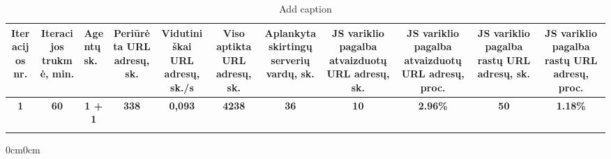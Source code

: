 \begin{table}[htbp]
\hspace{-5cm}
  \centering
  \caption{Add caption}
  \begin{adjustwidth}{-3cm}{0cm}
    \begin{tabular}{|c|c|c|c|c|c|c|c|c|c|c|}
    \hline
    \multicolumn{1}{|p{4.285em}|}{Iteracijos nr.} & \multicolumn{1}{p{4.215em}|}{Iteracijos trukmė, min.} & \multicolumn{1}{l|}{Agentų sk.} & \multicolumn{1}{p{6.355em}|}{Periūrėta URL adresų, sk.} & \multicolumn{1}{p{7.145em}|}{Vidutiniškai URL adresų, sk./s} & \multicolumn{1}{p{7.145em}|}{Viso aptikta URL adresų, sk.} & \multicolumn{1}{p{4.855em}|}{Aplankyta skirtingų serverių vardų, sk.} & \multicolumn{1}{p{5.285em}|}{JS variklio pagalba atvaizduotų URL adresų, sk.} & \multicolumn{1}{p{4.57em}|}{JS variklio pagalba atvaizduotų URL adresų, proc.} & \multicolumn{1}{p{4.57em}|}{JS variklio pagalba rastų URL adresų, sk.} & \multicolumn{1}{p{4.215em}|}{JS variklio pagalba rastų URL adresų, proc.} \bigstrut\\
    \hline
    \textbf{1} & \textbf{60} & \textbf{1 + 1} & \textbf{338} & \textbf{0,093} & \textbf{4238} & \textbf{36} & \textbf{10} & \textbf{2.96\%} & \textbf{50} & \textbf{1.18\%} \bigstrut\\
    \hline
        &     &     &     &     &     &     &     &     &     &  \bigstrut\\
    \hline
    \end{tabular}%
      \end{adjustwidth}{0cm}{0cm}
  \label{tab:addlabel}%
\end{table}%